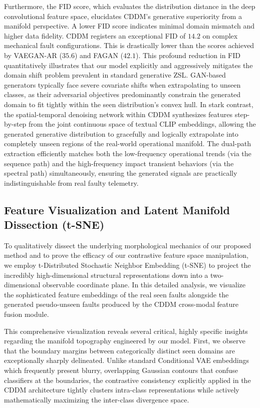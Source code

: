 Furthermore, the FID score, which evaluates the distribution distance in the deep convolutional feature space, elucidates CDDM's generative superiority from a manifold perspective. A lower FID score indicates minimal domain mismatch and higher data fidelity. CDDM registers an exceptional FID of $14.2$ on complex mechanical fault configurations. This is drastically lower than the scores achieved by VAEGAN-AR ($35.6$) and FAGAN ($42.1$). This profound reduction in FID quantitatively illustrates that our model explicitly and aggressively mitigates the domain shift problem prevalent in standard generative ZSL. GAN-based generators typically face severe covariate shifts when extrapolating to unseen classes, as their adversarial objectives predominantly constrain the generated domain to fit tightly within the seen distribution's convex hull. In stark contrast, the spatial-temporal denoising network within CDDM synthesizes features step-by-step from the joint continuous space of textual CLIP embeddings, allowing the generated generative distribution to gracefully and logically extrapolate into completely unseen regions of the real-world operational manifold. The dual-path extraction efficiently matches both the low-frequency operational trends (via the sequence path) and the high-frequency impact transient behaviors (via the spectral path) simultaneously, ensuring the generated signals are practically indistinguishable from real faulty telemetry.

\subsection{Feature Visualization and Latent Manifold Dissection (t-SNE)}
\label{subsec:tsne_visualization}

To qualitatively dissect the underlying morphological mechanics of our proposed method and to prove the efficacy of our contrastive feature space manipulation, we employ t-Distributed Stochastic Neighbor Embedding (t-SNE) to project the incredibly high-dimensional structural representations down into a two-dimensional observable coordinate plane. In this detailed analysis, we visualize the sophisticated feature embeddings of the real seen faults alongside the generated pseudo-unseen faults produced by the CDDM cross-modal feature fusion module.

This comprehensive visualization reveals several critical, highly specific insights regarding the manifold topography engineered by our model. First, we observe that the boundary margins between categorically distinct seen domains are exceptionally sharply delineated. Unlike standard Conditional VAE embeddings which frequently present blurry, overlapping Gaussian contours that confuse classifiers at the boundaries, the contrastive consistency explicitly applied in the CDDM architecture tightly clusters intra-class representations while actively mathematically maximizing the inter-class divergence space. 

